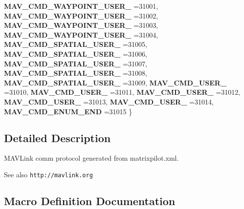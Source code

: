 \begin{DoxyCompactItemize}
\newline
\textbf{ M\+A\+V\+\_\+\+C\+M\+D\+\_\+\+W\+A\+Y\+P\+O\+I\+N\+T\+\_\+\+U\+S\+E\+R\+\_} =31001, 
\textbf{ M\+A\+V\+\_\+\+C\+M\+D\+\_\+\+W\+A\+Y\+P\+O\+I\+N\+T\+\_\+\+U\+S\+E\+R\+\_} =31002, 
\textbf{ M\+A\+V\+\_\+\+C\+M\+D\+\_\+\+W\+A\+Y\+P\+O\+I\+N\+T\+\_\+\+U\+S\+E\+R\+\_} =31003, 
\textbf{ M\+A\+V\+\_\+\+C\+M\+D\+\_\+\+W\+A\+Y\+P\+O\+I\+N\+T\+\_\+\+U\+S\+E\+R\+\_} =31004, 
\newline
\textbf{ M\+A\+V\+\_\+\+C\+M\+D\+\_\+\+S\+P\+A\+T\+I\+A\+L\+\_\+\+U\+S\+E\+R\+\_} =31005, 
\textbf{ M\+A\+V\+\_\+\+C\+M\+D\+\_\+\+S\+P\+A\+T\+I\+A\+L\+\_\+\+U\+S\+E\+R\+\_} =31006, 
\textbf{ M\+A\+V\+\_\+\+C\+M\+D\+\_\+\+S\+P\+A\+T\+I\+A\+L\+\_\+\+U\+S\+E\+R\+\_} =31007, 
\textbf{ M\+A\+V\+\_\+\+C\+M\+D\+\_\+\+S\+P\+A\+T\+I\+A\+L\+\_\+\+U\+S\+E\+R\+\_} =31008, 
\newline
\textbf{ M\+A\+V\+\_\+\+C\+M\+D\+\_\+\+S\+P\+A\+T\+I\+A\+L\+\_\+\+U\+S\+E\+R\+\_} =31009, 
\textbf{ M\+A\+V\+\_\+\+C\+M\+D\+\_\+\+U\+S\+E\+R\+\_} =31010, 
\textbf{ M\+A\+V\+\_\+\+C\+M\+D\+\_\+\+U\+S\+E\+R\+\_} =31011, 
\textbf{ M\+A\+V\+\_\+\+C\+M\+D\+\_\+\+U\+S\+E\+R\+\_} =31012, 
\newline
\textbf{ M\+A\+V\+\_\+\+C\+M\+D\+\_\+\+U\+S\+E\+R\+\_} =31013, 
\textbf{ M\+A\+V\+\_\+\+C\+M\+D\+\_\+\+U\+S\+E\+R\+\_} =31014, 
\textbf{ M\+A\+V\+\_\+\+C\+M\+D\+\_\+\+E\+N\+U\+M\+\_\+\+E\+ND} =31015
 \}
\end{DoxyCompactItemize}


\subsection{Detailed Description}
M\+A\+V\+Link comm protocol generated from matrixpilot.\+xml. 

\begin{DoxySeeAlso}{See also}
{\tt http\+://mavlink.\+org} 
\end{DoxySeeAlso}


\subsection{Macro Definition Documentation}
\mbox{\label{matrixpilot_8h_a073ec1e277b3d058a124e241c473d5ee}} 

